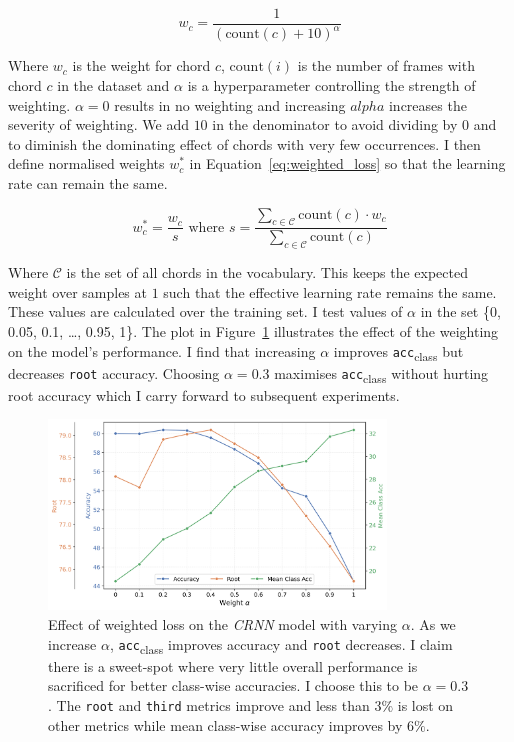 \begin{equation}\label{eq:weighting}
    w_c = \frac{1}{{(\text{count}(c) + 10)}^\alpha}
\end{equation}

Where $w_c$ is the weight for chord $c$, $\text{count}(i)$ is the number of frames with chord $c$ in the dataset and $\alpha$ is a hyperparameter controlling the strength of weighting. $\alpha=0$ results in no weighting and increasing $alpha$ increases the severity of weighting. We add $10$ in the denominator to avoid dividing by $0$ and to diminish the dominating effect of chords with very few occurrences. I then define normalised weights $w_c^*$ in Equation~\ref{eq:weighted_loss} so that the learning rate can remain the same.

\begin{equation}\label{eq:weighted_loss}
    w_c^* = \frac{w_c}{s} \text{ where } s = \frac{\sum_{c\in \mathcal{C}} \text{count}(c)\cdot w_c}{\sum_{c\in \mathcal{C}} \text{count}(c)}
\end{equation}

Where $\mathcal{C}$ is the set of all chords in the vocabulary. This keeps the expected weight over samples at $1$ such that the effective learning rate remains the same. These values are calculated over the training set. I test values of $\alpha$ in the set \{0, 0.05, 0.1, \ldots, 0.95, 1\}. The plot in Figure~\ref{fig:weighted_loss} illustrates the effect of the weighting on the model's performance. I find that increasing $\alpha$ improves \texttt{acc}\textsubscript{class} but decreases \texttt{root} accuracy. Choosing $\alpha = 0.3$ maximises \texttt{acc}\textsubscript{class} without hurting root accuracy which I carry forward to subsequent experiments.

\begin{figure}[H]
    \centering
    \includegraphics[width=0.8\textwidth]{figures/weight_alpha_search_trim.png}
    \caption{Effect of weighted loss on the \emph{CRNN} model with varying $\alpha$. As we increase $\alpha$, \texttt{acc}\textsubscript{class} improves accuracy and \texttt{root} decreases. I claim there is a sweet-spot where very little overall performance is sacrificed for better class-wise accuracies. I choose this to be $\alpha = 0.3$. The \texttt{root} and \texttt{third} metrics improve and less than $3\%$ is lost on other metrics while mean class-wise accuracy improves by $6\%$.}\label{fig:weighted_loss}
\end{figure}


